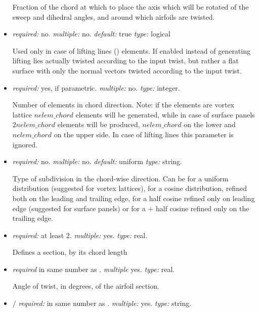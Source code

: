 \begin{itemize}
Fraction of the chord at which to place the axis which will be rotated of the sweep and dihedral angles, and 
around which airfoils are twisted. 

\item {} \textit{required:} no. \textit{multiple:} no. 
\textit{default:} true \textit{type:} logical

Used only in case of lifting lines () elements. If enabled instead of generating lifting lies 
actually twisted according to the input twist, but rather a flat surface with only the normal vectors twisted 
according to the input twist. 

\item {} \textit{required:} yes, if parametric. \textit{multiple:} no. \textit{type:} integer.

Number of elements in chord direction. Note: if the elements are vortex lattice $nelem\_chord$ 
elements will be generated, while in case of surface panels $2nelem\_chord$ elements will be produced, 
$nelem\_chord$ on the lower and $nelem\_chord$ on the upper side. In case of lifting lines this parameter is ignored.

\item {} \textit{required:} no. \textit{multiple:} no. 
\textit{default:} uniform \textit{type:} string.

Type of subdivision in the chord-wise direction. Can be  for a uniform distribution (suggested for vortex lattices), 
 for a cosine distribution, refined both on the leading and trailing edge, 
 for a half cosine refined only on leading edge (suggested for surface panels) or  for a +
half cosine refined only on the trailing edge. 

\item {} \textit{required:} at least 2. \textit{multiple:} yes. \textit{type:} real.

Defines a section, by its chord length

\item {} \textit{required} in same number as . \textit{multiple} yes. \textit{type:} real.

Angle of twist, in degrees, of the airfoil section.

\item {}/ \textit{required:} in same number as 
. \textit{multiple:} yes. \textit{type:} string.


\end{itemize}
